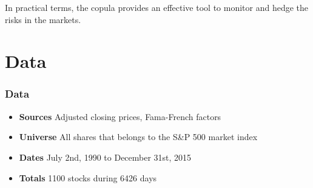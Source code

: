 \documentclass[pdf,9pt,xcolor=dvipsnames,hide notes]{beamer}
\begin{document}
\begin{frame}[label=frame4b]
			\begin{exampleblock}
		\centering
		In practical terms, the copula provides an effective tool to monitor and hedge the risks in the markets.
	\end{exampleblock}

		
\end{frame}

	\section{Data}	

\begin{frame}[label=frame2b]
	\frametitle{Data}
		\begin{itemize}
		\setlength\itemsep{1em}
		\justifying
		
		\item 	\textbf{Sources} Adjusted closing prices, Fama-French factors
		\item \textbf{Universe} All shares that belongs to the S\&P 500 market index  
		\item \textbf{Dates} July 2nd, 1990 to December 31st, 2015
		\item \textbf{Totals} 1100 stocks during 6426 days
	
		\end{itemize}
		
	
\end{frame}
\end{document}
